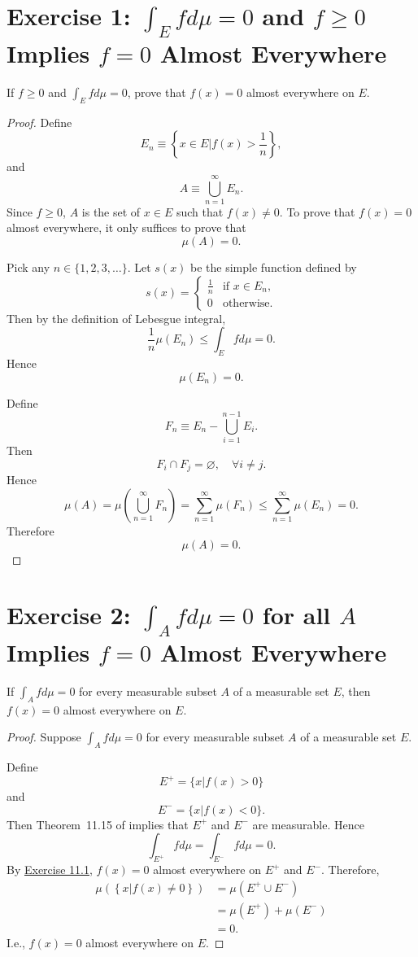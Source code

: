 \documentclass{amsbook}
\theoremstyle{definition}
\theoremstyle{remark}
\numberwithin{section}{chapter}
\numberwithin{equation}{chapter}
\begin{document}
\section{Exercise 1: $\int_E fd\mu=0$ and $f\geqslant0$ Implies $f=0$ Almost Everywhere}\label{Exercise 11.1}
If $f\geqslant0$ and $\int_E fd\mu=0$, prove that $f(x)=0$ almost everywhere on $E$.
\begin{proof}
Define\[
E_n\equiv\left\{x\in E|f(x)>\frac{1}{n}\right\},
\]and\[
A\equiv\bigcup_{n=1}^\infty E_n.
\]Since $f\geqslant0$, $A$ is the set of $x\in E$ such that $f(x)\ne0$. To prove that $f(x)=0$ almost everywhere, it only suffices to prove that\[
\mu(A)=0.
\]

Pick any $n\in\{1,2,3,\dots\}$. Let $s(x)$ be the simple function defined by\[
s(x)=\begin{cases} 
\frac{1}{n} & \text{if } x\in E_n,\\
0 & \text{otherwise}.
\end{cases}
\]Then by the definition of Lebesgue integral,\[
\frac{1}{n}\mu(E_n)\leqslant\int_E fd\mu=0.
\]Hence\[
\mu(E_n)=0.
\]

Define\[
F_n\equiv E_n-\bigcup_{i=1}^{n-1}E_i.
\]Then\[
F_i\cap F_j=\varnothing,\quad\forall i\ne j.
\]Hence\[
\mu(A)=\mu(\bigcup_{n=1}^\infty F_n)=\sum_{n=1}^\infty\mu(F_n)\leqslant\sum_{n=1}^\infty\mu(E_n)=0.
\]Therefore\[
\mu(A)=0.
\]
\end{proof}
\section{Exercise 2: $\int_A fd\mu=0$ for all $A$ Implies $f=0$ Almost Everywhere}
If $\int_Afd\mu=0$ for every measurable subset $A$ of a measurable set $E$, then $f(x)=0$ almost everywhere on $E$.
\begin{proof}
Suppose $\int_Afd\mu=0$ for every measurable subset $A$ of a measurable set $E$.

Define\[
E^+=\{x|f(x)>0\}
\]and\[
E^-=\{x|f(x)<0\}.
\]Then Theorem~11.15 of \cite{rudin1976principles} implies that $E^+$ and $E^-$ are measurable. Hence\[
\int_{E^+}fd\mu=\int_{E^-}fd\mu=0.
\]By \hyperref[Exercise 11.1]{Exercise 11.1}, $f(x)=0$ almost everywhere on $E^+$ and $E^-$. Therefore,\[
\begin{split}
\mu\left(\left\{x|f(x)\ne0\right\}\right)&=\mu\left(E^+\cup E^-\right)\\
&=\mu\left(E^+\right)+\mu\left(E^-\right)\\
&=0.
\end{split}
\] I.e., $f(x)=0$ almost everywhere on $E$.
\end{proof}
\end{document}
